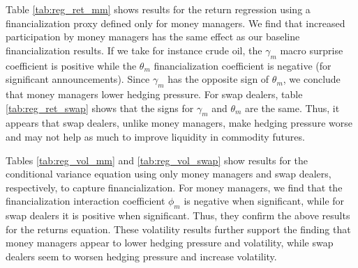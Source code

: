 \documentclass[12pt]{article}
\begin{document}
 
Table \ref{tab:reg_ret_mm} shows results for the return regression using a financialization proxy defined only for money managers. We find that increased participation by money managers has the same effect as our baseline financialization results. If we take for instance crude oil, the $\gamma_m$ macro surprise coefficient is positive while the  $\theta_m$ financialization coefficient is negative (for significant announcements). Since $\gamma_m$ has the opposite sign of $\theta_m$, we conclude that money managers lower hedging pressure. For swap dealers, table \ref{tab:reg_ret_swap} shows that the signs for $\gamma_m$ and $\theta_m$ are the same.  Thus, it appears that swap dealers, unlike money managers, make hedging pressure worse and may not help as much to improve liquidity in commodity futures. 

Tables \ref{tab:reg_vol_mm} and \ref{tab:reg_vol_swap}  show results for the conditional variance equation using only money managers and swap dealers, respectively, to capture financialization. For money managers, we find that the financialization interaction coefficient $\phi_m$ is negative when significant, while for swap dealers it is positive when significant. Thus, they confirm the above results for the returns equation. These volatility results further support the finding that money managers appear to lower hedging pressure and volatility, while swap dealers seem to worsen hedging pressure and increase volatility.
\end{document}
